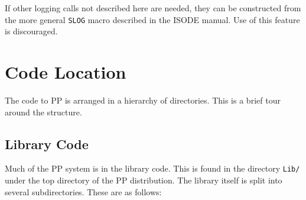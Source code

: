 If other logging calls not described here are needed, they can be
constructed from the more general \verb|SLOG| macro
described in the ISODE manual. Use of this feature is discouraged.

\section {Code Location}

The code to PP is arranged in a hierarchy of directories. This is a
brief tour around the structure.

\subsection{Library Code}

Much of the PP system is in the library code. This is found in
the directory \verb|Lib/| under the top directory of the PP
distribution.  The library itself is split into several
subdirectories. These are as follows:

